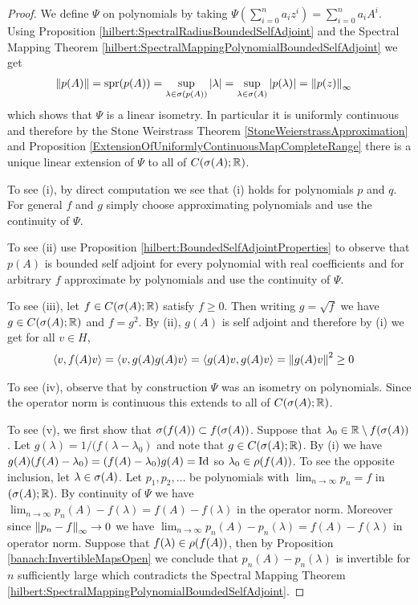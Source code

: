 \begin{proof}
We define $\Psi$ on polynomials by taking $\Psi \left(\sum_{i=0}^n a_i z^i \right) = \sum_{i=0}^n a_i A^i$.  Using Proposition \ref{hilbert:SpectralRadiusBoundedSelfAdjoint} and the Spectral Mapping Theorem \ref{hilbert:SpectralMappingPolynomialBoundedSelfAdjoint} we get
\begin{align*}
\left \lVert p(A) \right \rVert &= \operatorname*{spr}(p(A)) = \sup_{\lambda \in \sigma(p(A))} \left \vert \lambda \right \vert = \sup_{\lambda \in \sigma(A)} \left \vert p(\lambda) \right \vert = \left \lVert p(z) \right \rVert_\infty
\end{align*}
which shows that $\Psi$ is a linear isometry.  In particular it is uniformly continuous and therefore by the Stone Weirstrass Theorem \ref{StoneWeierstrassApproximation} and Proposition \ref{ExtensionOfUniformlyContinuousMapCompleteRange} there is a unique linear extension of $\Psi$ to all of $C(\sigma(A); \mathbb{R})$.

To see (i), by direct computation we see that (i) holds for polynomials $p$ and $q$.  For general $f$ and $g$ simply choose approximating polynomials and use the continuity of $\Psi$.

To see (ii) use Proposition \ref{hilbert:BoundedSelfAdjointProperties} to observe that $p(A)$ is bounded self adjoint for every polynomial with real coefficients and for arbitrary $f$ approximate by polynomials and use the continuity of $\Psi$.

To see (iii), let $f \in C(\sigma(A); \mathbb{R})$ satisfy $f \geq 0$.  Then  writing $g = \sqrt{f}$ we have $g \in C(\sigma(A); \mathbb{R})$ and $f = g^2$.  By (ii), $g(A)$ is self adjoint and therefore by (i) we get for all $v \in H$,
\begin{align*}
\langle v, f(A) v \rangle &= \langle v, g(A) g(A) v \rangle = \langle g(A) v, g(A) v \rangle = \left \lVert g(A)v \right \rVert^2 \geq 0
\end{align*}

To see (iv), observe that by construction $\Psi$ was an isometry on polynomials.  Since the operator norm is continuous this extends to all of $C(\sigma(A); \mathbb{R})$.

To see (v), we first show that $\sigma(f(A)) \subset f(\sigma(A))$.  Suppose that $\lambda_0 \in \mathbb{R} \setminus f(\sigma(A))$.  Let $g(\lambda) = 1/(f(\lambda - \lambda_0)$ and note that $g \in C(\sigma(A); \mathbb{R})$.  By (i) we have $g(A)(f(A) - \lambda_0) = (f(A) - \lambda_0) g(A) = \operatorname*{Id}$ so $\lambda_0 \in \rho(f(A))$.  To see the opposite inclusion, let $\lambda \in \sigma(A)$.  Let $p_1, p_2, \dotsc$ be polynomials with $\lim_{n \to \infty} p_n = f$ in $(\sigma(A); \mathbb{R})$.  By continuity of $\Psi$ we have $\lim_{n \to \infty} p_n(A) - f(\lambda) = f(A) - f(\lambda)$ in the operator norm.  Moreover since $\left \lVert p_n - f \right \rVert_\infty \to 0$ we have $\lim_{n \to \infty} p_n(A) - p_n(\lambda) = f(A) - f(\lambda)$ in operator norm.  Suppose that $f(\lambda) \in \rho(f(A))$, then by Proposition \ref{banach:InvertibleMapsOpen} we conclude that $p_n(A) - p_n(\lambda)$ is invertible for $n$ sufficiently large which contradicts the Spectral Mapping Theorem \ref{hilbert:SpectralMappingPolynomialBoundedSelfAdjoint}.
\end{proof}


